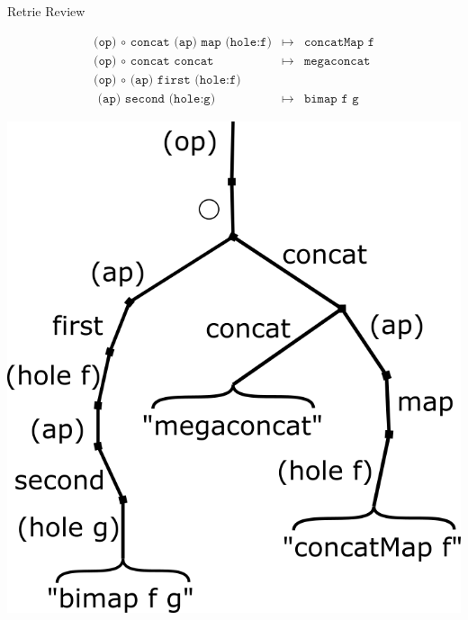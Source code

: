 \documentclass{beamer}
\begin{document}
  \begin{frame}{Retrie Review}

    \begin{align*}
        \texttt{(op) $\circ$ concat (ap) map (hole:f)}
        & \mapsto & \texttt{concatMap f}
      \\ \texttt{(op) $\circ$ concat concat}
        & \mapsto & \texttt{megaconcat}
      \\ \texttt{(op) $\circ$ (ap) first (hole:f)}
      \\ \texttt{\ \ \ (ap) second (hole:g)}
        & \mapsto & \texttt{bimap f g}
    \end{align*}

    \includegraphics[height=0.5\textheight]{trieOne}
    
  \end{frame}
\end{document}
